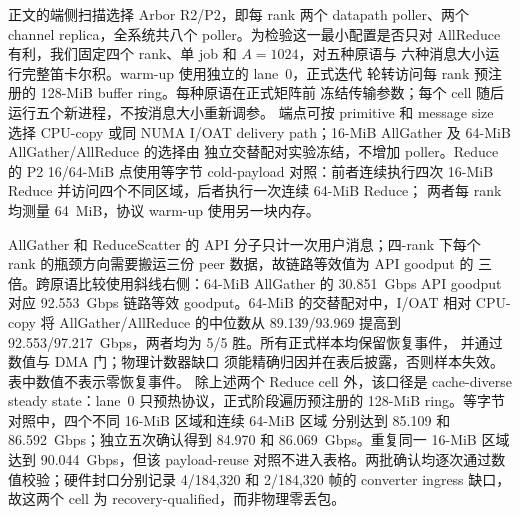 正文的端侧扫描选择 Arbor R2/P2，即每 rank 两个 datapath poller、两个
channel replica，全系统共八个 poller。为检验这一最小配置是否只对
AllReduce 有利，我们固定四个 rank、单 job 和 $A=1024$，对五种原语与
六种消息大小运行完整笛卡尔积。warm-up 使用独立的 lane~0，正式迭代
轮转访问每 rank 预注册的 128-MiB buffer ring。每种原语在正式矩阵前
冻结传输参数；每个 cell 随后运行五个新进程，不按消息大小重新调参。
端点可按 primitive 和 message size 选择 CPU-copy 或同 NUMA I/OAT
delivery path；16-MiB AllGather 及 64-MiB AllGather/AllReduce 的选择由
独立交替配对实验冻结，不增加 poller。Reduce
的 P2 16/64-MiB 点使用等字节 cold-payload 对照：前者连续执行四次
16-MiB Reduce 并访问四个不同区域，后者执行一次连续 64-MiB Reduce；
两者每 rank 均测量 64~MiB，协议 warm-up 使用另一块内存。

\begin{table}[t]
\centering
\small
\caption{Arbor 在最小 R2/P2 端侧配置下的五原语与消息大小矩阵。每格为
五个新进程的中位 logical goodput（Gbps）。AllGather 和 ReduceScatter
报告 API goodput / $N=4$ 瓶颈链路等效 goodput；其余原语的换算系数为 1。}
\label{tab:physical-workload}
\setlength{\tabcolsep}{3.5pt}
\end{table}

AllGather 和 ReduceScatter 的 API 分子只计一次用户消息；四-rank 下每个
rank 的瓶颈方向需要搬运三份 peer 数据，故链路等效值为 API goodput 的
三倍。跨原语比较使用斜线右侧：64-MiB AllGather 的 30.851~Gbps API
goodput 对应 92.553~Gbps 链路等效 goodput。64-MiB 的交替配对中，I/OAT
相对 CPU-copy 将 AllGather/AllReduce 的中位数从 89.139/93.969 提高到
92.553/97.217~Gbps，两者均为 5/5 胜。所有正式样本均保留恢复事件，
并通过数值与 DMA 门；物理计数器缺口
须能精确归因并在表后披露，否则样本失效。表中数值不表示零恢复事件。
除上述两个 Reduce cell 外，该口径是
cache-diverse steady state：lane~0 只预热协议，正式阶段遍历预注册的
128-MiB ring。等字节对照中，四个不同 16-MiB 区域和连续 64-MiB 区域
分别达到 85.109 和 86.592~Gbps；独立五次确认得到 84.970 和
86.069~Gbps。重复同一 16-MiB 区域达到 90.044~Gbps，但该 payload-reuse
对照不进入表格。两批确认均逐次通过数值校验；硬件封口分别记录
4/184,320 和 2/184,320 帧的 converter ingress 缺口，故这两个 cell 为
recovery-qualified，而非物理零丢包。

